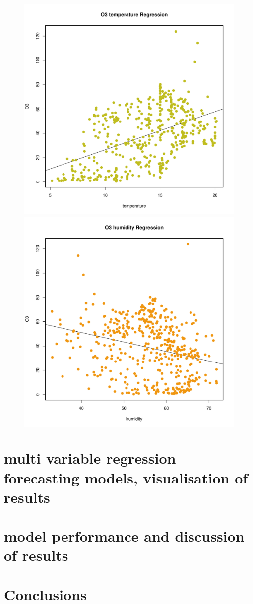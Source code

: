 \documentclass[a4paper,12pt,reqno]{report}
\begin{document}
\begin{figure}[H]
    \includegraphics[width=0.4\linewidth]{figures/O3_temperature_Regression.pdf}
    \includegraphics[width=0.4\linewidth]{figures/O3_humidity_Regression.pdf}
\end{figure}
\section{multi variable regression forecasting models, visualisation of results}
\label{sec:multi variable regression forecasting models, visualisation of results}
\section{model performance and discussion of results}
\label{sec:model performance and discussion of results}


\section{Conclusions}
    
\newpage


\end{document}
